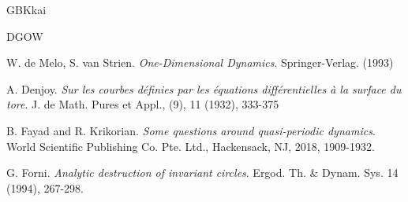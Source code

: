 \documentclass{amsart}
\theoremstyle{definition}
\begin{document}
\begin{CJK*}{GBK}{kai}
\begin{thebibliography}{DGOW}
			
			
			
			
			
			
			
			
			
			
			  W. de Melo, S. van Strien. {\it One-Dimensional Dynamics}. Springer-Verlag. (1993)
			
			
			 A. Denjoy.
			{\it Sur les courbes d\'{e}finies par les \'{e}quations diff\'{e}rentielles \`{a} la surface du tore}. J. de Math. Pures et Appl.,
			(9), 11 (1932), 333-375
			
			
			
			
			 B. Fayad and R. Krikorian. {\it   Some questions around quasi-periodic dynamics}.
			World Scientific Publishing Co. Pte. Ltd., Hackensack, NJ, 2018, 1909-1932.
			
			 G. Forni. {\it
				Analytic destruction of invariant circles}. Ergod.
			Th. \& Dynam. Sys. {14} (1994), 267-298.
			

\end{thebibliography}
\end{CJK*}
\end{document}
